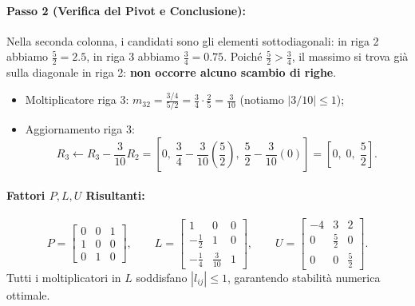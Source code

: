 \paragraph{Passo 2 (Verifica del Pivot e Conclusione):}
Nella seconda colonna, i candidati sono gli elementi sottodiagonali: in riga 2 abbiamo $\frac{5}{2} = 2.5$, in riga 3 abbiamo $\frac{3}{4} = 0.75$.
Poich\'e $\frac{5}{2} > \frac{3}{4}$, il massimo si trova gi\`a sulla diagonale in riga 2: \textbf{non occorre alcuno scambio di righe}.
\begin{itemize}
    \item Moltiplicatore riga 3: $m_{32} = \frac{3/4}{5/2} = \frac{3}{4} \cdot \frac{2}{5} = \frac{3}{10}$ (notiamo $|3/10| \le 1$);
    \item Aggiornamento riga 3:
    \begin{equation}
        R_3 \leftarrow R_3 - \frac{3}{10} R_2 = \left[0, \; \frac{3}{4} - \frac{3}{10}\left(\frac{5}{2}\right), \; \frac{5}{2} - \frac{3}{10}(0)\right] = \left[0, \; 0, \; \frac{5}{2}\right].
    \end{equation}
\end{itemize}

\paragraph{Fattori $P, L, U$ Risultanti:}
\begin{equation}
    P = \begin{bmatrix}
        0 & 0 & 1 \\
        1 & 0 & 0 \\
        0 & 1 & 0
    \end{bmatrix}, \qquad
    L = \begin{bmatrix}
        1 & 0 & 0 \\
        -\frac{1}{2} & 1 & 0 \\
        -\frac{1}{4} & \frac{3}{10} & 1
    \end{bmatrix}, \qquad
    U = \begin{bmatrix}
        -4 & 3 & 2 \\
        0 & \frac{5}{2} & 0 \\
        0 & 0 & \frac{5}{2}
    \end{bmatrix}.
\end{equation}
Tutti i moltiplicatori in $L$ soddisfano $|l_{ij}| \le 1$, garantendo stabilit\`a numerica ottimale.

